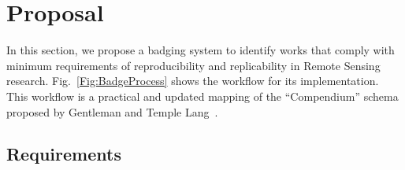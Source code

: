 \documentclass[journal,twoside]{IEEEtran}
\begin{document}
\section{Proposal}

In this section, we propose a badging system to identify works that comply with minimum requirements of reproducibility and replicability in Remote Sensing research.
Fig.~\ref{Fig:BadgeProcess} shows the workflow for its implementation.
This workflow is a practical and updated mapping of the ``Compendium'' schema proposed by Gentleman and Temple Lang~\cite{StatisticalAnalysesReproducibleResearch}.

\subsection{Requirements}
\end{document}

